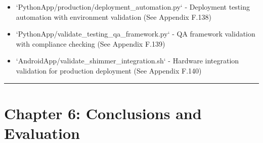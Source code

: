 \documentclass[12pt,a4paper]{report}
\begin{document}
\begin{itemize}
\item `PythonApp/production/deployment_automation.py` - Deployment testing automation with environment validation (See
  Appendix F.138)
\item `PythonApp/validate_testing_qa_framework.py` - QA framework validation with compliance checking (See Appendix F.139)
\item `AndroidApp/validate_shimmer_integration.sh` - Hardware integration validation for production deployment (See Appendix
  F.140)

\end{itemize}
\hrule

\section{Chapter 6: Conclusions and Evaluation}
\end{document}
